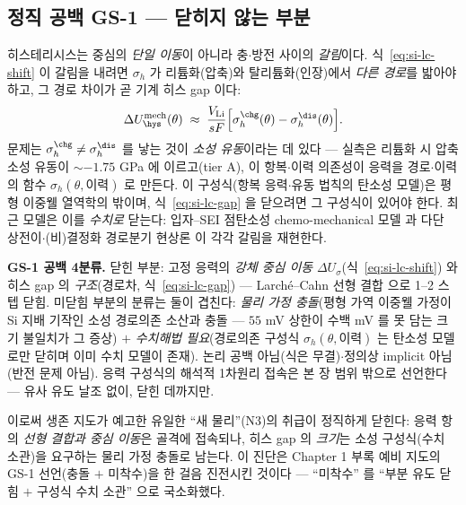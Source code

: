 \subsection{정직 공백 GS-1 --- 닫히지 않는 부분}\label{ssec:si-gs1}
히스테리시스는 중심의 \emph{단일 이동}이 아니라 충$\cdot$방전 사이의 \emph{갈림}이다. 식~\eqref{eq:si-lc-shift}
이 갈림을 내려면 $\sigma_h$ 가 리튬화(압축)와 탈리튬화(인장)에서 \emph{다른 경로}를 밟아야 하고, 그 경로
차이가 곧 기계 히스 gap 이다:
\begin{equation}
\Delta U_\hys^{\mathrm{mech}}(\theta)\;\approx\;\frac{V_\mathrm{Li}}{sF}\Bigl[\sigma_h^{\chg}(\theta)-\sigma_h^{\dis}(\theta)\Bigr].
\label{eq:si-lc-gap}
\end{equation}
문제는 $\sigma_h^{\chg}\ne\sigma_h^{\dis}$ 를 낳는 것이 \emph{소성 유동}이라는 데 있다 --- 실측은 리튬화 시
압축 소성 유동이 $\sim-1.75$ GPa 에 이르고\cite{sethuraman_stressevo2010}(tier A), 이 항복$\cdot$이력
의존성이 응력을 경로$\cdot$이력의 함수 $\sigma_h(\theta,\text{이력})$ 로 만든다. 이 구성식(항복 응력$\cdot$유동
법칙의 탄소성 모델)은 평형 이중웰 열역학의 밖이며, 식~\eqref{eq:si-lc-gap} 을 닫으려면 그 구성식이 있어야
한다. 최근 모델은 이를 \emph{수치로} 닫는다: 입자--SEI 점탄소성 chemo-mechanical
모델\cite{koebbing2024} 과 다단 상전이$\cdot$(비)결정화 경로분기 현상론\cite{jiang_sihys2020} 이 각각
갈림을 재현한다.

\begin{keybox}
\textbf{GS-1 공백 4분류.} 닫힌 부분: 고정 응력의 \emph{강체 중심 이동} $\Delta U_\sigma$(식~\eqref{eq:si-lc-shift})
와 히스 gap 의 \emph{구조}(경로차, 식~\eqref{eq:si-lc-gap}) --- Larché--Cahn 선형 결합\cite{larchecahn1973}
으로 1--2 스텝 닫힘. 미닫힘 부분의 분류는 둘이 겹친다: \emph{물리 가정 충돌}(평형 가역 이중웰 가정이 Si
지배 기작인 소성 경로의존 소산과 충돌 --- $55$ mV 상한이 수백 mV 를 못 담는 크기 불일치가 그 증상) $+$
\emph{수치해법 필요}(경로의존 구성식 $\sigma_h(\theta,\text{이력})$ 는 탄소성 모델로만 닫히며 이미
수치 모델\cite{koebbing2024,jiang_sihys2020}이 존재). 논리 공백 아님(식은 무결)$\cdot$정의상 implicit
아님(반전 문제 아님). 응력 구성식의 해석적 1차원리 접속은 본 장 범위 밖으로 선언한다 --- 유사 유도 날조
없이, 닫힌 데까지만.
\end{keybox}

이로써 생존 지도가 예고한 유일한 ``새 물리''(N3)의 취급이 정직하게 닫힌다: 응력 항의 \emph{선형 결합과
중심 이동}은 골격에 접속되나, 히스 gap 의 \emph{크기}는 소성 구성식(수치 소관)을 요구하는 물리 가정 충돌로
남는다. 이 진단은 Chapter 1 부록 예비 지도의 GS-1 선언(충돌 $+$ 미착수)을 한 걸음 진전시킨 것이다 ---
``미착수'' 를 ``부분 유도 닫힘 $+$ 구성식 수치 소관'' 으로 국소화했다.

